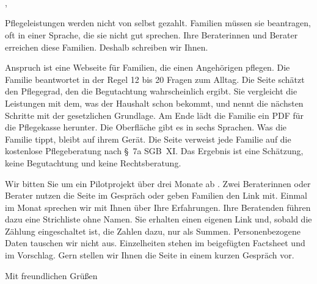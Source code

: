 \documentclass[fontsize=11pt,paper=a4,parskip=half,fromalign=right,
  fromrule=afteraddress,fromemail=true,fromphone=true,
  foldmarks=true,enlargefirstpage=true]{scrlttr2}
\begin{document}
\begin{letter}{\\
  \\
  \\
  }

\opening{,}

Pflegeleistungen werden nicht von selbst gezahlt. Familien müssen sie beantragen,
oft in einer Sprache, die sie nicht gut sprechen. Ihre Beraterinnen und Berater
erreichen diese Familien. Deshalb schreiben wir Ihnen.

Anspruch ist eine Webseite für Familien, die einen Angehörigen pflegen. Die Familie
beantwortet in der Regel 12 bis 20 Fragen zum Alltag. Die Seite schätzt den
Pflegegrad, den die Begutachtung wahrscheinlich ergibt. Sie vergleicht die Leistungen
mit dem, was der Haushalt schon bekommt, und nennt die nächsten Schritte mit der
gesetzlichen Grundlage. Am Ende lädt die Familie ein PDF für die
Pflegekasse herunter. Die Oberfläche gibt es in sechs Sprachen. Was die Familie
tippt, bleibt auf ihrem Gerät. Die Seite verweist jede Familie auf die kostenlose
Pflegeberatung nach §~7a SGB~XI. Das Ergebnis ist eine Schätzung, keine Begutachtung
und keine Rechtsberatung.

Wir bitten Sie um ein Pilotprojekt über drei Monate ab . Zwei
Beraterinnen oder Berater nutzen die Seite im Gespräch oder geben Familien den Link
mit. Einmal im Monat sprechen wir mit Ihnen über Ihre Erfahrungen. Ihre Beratenden
führen dazu eine Strichliste ohne Namen. Sie erhalten einen eigenen Link und, sobald
die Zählung eingeschaltet ist, die Zahlen dazu, nur als Summen. Personenbezogene Daten tauschen wir nicht aus.
Einzelheiten stehen im beigefügten Factsheet und im Vorschlag. Gern stellen wir Ihnen
die Seite in einem kurzen Gespräch vor.

\closing{Mit freundlichen Grüßen}


\end{letter}
\end{document}
